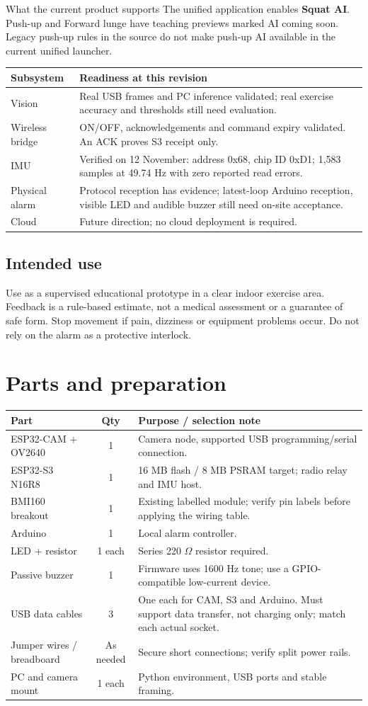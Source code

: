 \documentclass[11pt,a4paper]{article}
\newcommand{\page}[1]{\clearpage\section{#1}}
\begin{document}
\begin{note}{What the current product supports}
The unified application enables \textbf{Squat AI}. Push-up and Forward lunge have teaching previews marked AI coming soon. Legacy push-up rules in the source do not make push-up AI available in the current unified launcher.
\end{note}
\par\begin{tabularx}{\linewidth}{@{}l X@{}}\toprule
Subsystem & Readiness at this revision\\\midrule
Vision & Real USB frames and PC inference validated; real exercise accuracy and thresholds still need evaluation.\\
Wireless bridge & ON/OFF, acknowledgements and command expiry validated. An ACK proves S3 receipt only.\\
IMU & Verified on 12 November: address 0x68, chip ID 0xD1; 1,583 samples at 49.74 Hz with zero reported read errors.\\
Physical alarm & Protocol reception has evidence; latest-loop Arduino reception, visible LED and audible buzzer still need on-site acceptance.\\
Cloud & Future direction; no cloud deployment is required.\\\bottomrule
\end{tabularx}
\subsection{Intended use}
Use as a supervised educational prototype in a clear indoor exercise area. Feedback is a rule-based estimate, not a medical assessment or a guarantee of safe form. Stop movement if pain, dizziness or equipment problems occur. Do not rely on the alarm as a protective interlock.
\page{Parts and preparation}
\par\begin{tabularx}{\linewidth}{@{}l c X@{}}\toprule
Part & Qty & Purpose / selection note\\\midrule
ESP32-CAM + OV2640 & 1 & Camera node, supported USB programming/serial connection.\\
ESP32-S3 N16R8 & 1 & 16 MB flash / 8 MB PSRAM target; radio relay and IMU host.\\
BMI160 breakout & 1 & Existing labelled module; verify pin labels before applying the wiring table.\\
Arduino & 1 & Local alarm controller.\\
LED + resistor & 1 each & Series 220 $\Omega$ resistor required.\\
Passive buzzer & 1 & Firmware uses 1600 Hz tone; use a GPIO-compatible low-current device.\\
USB data cables & 3 & One each for CAM, S3 and Arduino. Must support data transfer, not charging only; match each actual socket.\\
Jumper wires / breadboard & As needed & Secure short connections; verify split power rails.\\
PC and camera mount & 1 each & Python environment, USB ports and stable framing.\\\bottomrule
\end{tabularx}
\end{document}
